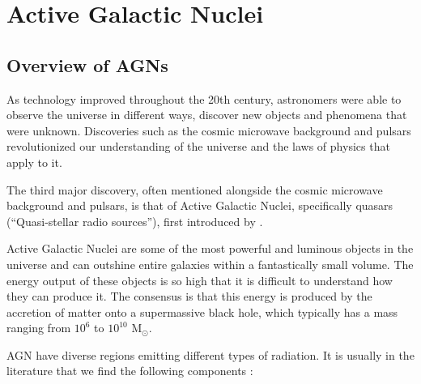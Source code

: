 \chapter{Active Galactic Nuclei}
\label{chap:Active Galactic Nuclei}
\section{Overview of AGNs}
As technology improved throughout the 20th century, astronomers were able to observe the universe in different ways, discover new objects and phenomena that were unknown. Discoveries such as the cosmic microwave background and pulsars revolutionized our understanding of the universe and the laws of physics that apply to it.

The third major discovery, often mentioned alongside the cosmic microwave background and pulsars, is that of Active Galactic Nuclei, specifically quasars (``Quasi-stellar radio sources''), first introduced by \citet{10.1063/1.3051610}.

Active Galactic Nuclei are some of the most powerful and luminous objects in the universe and can outshine entire galaxies within a fantastically small volume. The energy output of these objects is so high that it is difficult to understand how they can produce it. The consensus is that this energy is produced by the accretion of matter onto a supermassive black hole, which typically has a mass ranging from $10^6$ to $10^{10}$ $\text{M}_\odot$.

AGN have diverse regions emitting different types of radiation. It is usually in the literature that we find the following components \citep{RadiativeProcesses}:

